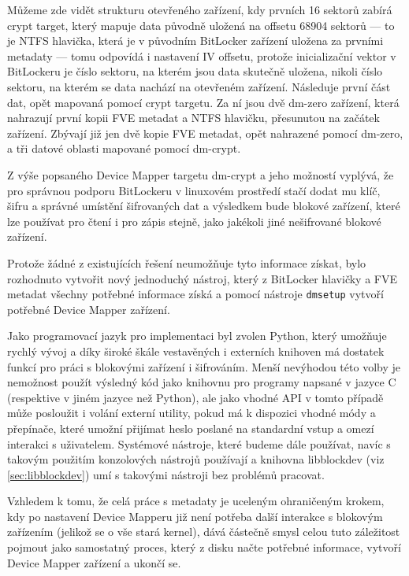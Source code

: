 Můžeme zde vidět strukturu otevřeného zařízení, kdy prvních 16 sektorů zabírá crypt target, který mapuje data původně uložená na offsetu 68904 sektorů --- to je NTFS hlavička, která je v původním BitLocker zařízení uložena za prvními metadaty --- tomu odpovídá i nastavení IV offsetu, protože inicializační vektor v BitLockeru je číslo sektoru, na kterém jsou data skutečně uložena, nikoli číslo sektoru, na kterém se data nachází na otevřeném zařízení. Následuje první část dat, opět mapovaná pomocí crypt targetu. Za ní jsou dvě dm-zero zařízení, která nahrazují první kopii FVE metadat a NTFS hlavičku, přesunutou na začátek zařízení. Zbývají již jen dvě kopie FVE metadat, opět nahrazené pomocí dm-zero, a tři datové oblasti mapované pomocí dm-crypt.

\label{sec:implementace-nastroj}

Z výše popsaného Device Mapper targetu dm-crypt a jeho možností vyplývá, že pro správnou podporu BitLockeru v linuxovém prostředí stačí dodat mu klíč, šifru a správné umístění šifrovaných dat a výsledkem bude blokové zařízení, které lze používat pro čtení i pro zápis stejně, jako jakékoli jiné nešifrované blokové zařízení.

Protože žádné z existujících řešení neumožňuje tyto informace získat, bylo rozhodnuto vytvořit nový jednoduchý nástroj, který z BitLocker hlavičky a FVE metadat všechny potřebné informace získá a pomocí nástroje \texttt{dmsetup} vytvoří potřebné Device Mapper zařízení.


Jako programovací jazyk pro implementaci byl zvolen Python, který umožňuje rychlý vývoj a díky široké škále vestavěných i externích knihoven má dostatek funkcí pro práci s blokovými zařízení i šifrováním. Menší nevýhodou této volby je nemožnost použít výsledný kód jako knihovnu pro programy napsané v jazyce C (respektive v jiném jazyce než Python), ale jako vhodné API v tomto případě může posloužit i volání externí utility, pokud má k dispozici vhodné módy a přepínače, které umožní přijímat heslo poslané na standardní vstup a omezí interakci s uživatelem. Systémové nástroje, které budeme dále používat, navíc s takovým použitím konzolových nástrojů používají a knihovna libblockdev (viz \ref{sec:libblockdev}) umí s takovými nástroji bez problémů pracovat.

Vzhledem k tomu, že celá práce s metadaty je uceleným ohraničeným krokem, kdy po nastavení Device Mapperu již není potřeba další interakce s blokovým zařízením (jelikož se o vše stará kernel), dává částečně smysl celou tuto záležitost pojmout jako samostatný proces, který z disku načte potřebné informace, vytvoří Device Mapper zařízení a ukončí se.

